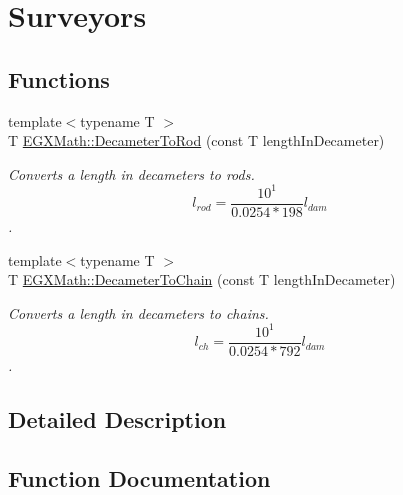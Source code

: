 \hypertarget{group___e_g_x_math-_conversions-_length_conversions-_s_i-_decameter-_surveyors}{}\section{Surveyors}
\label{group___e_g_x_math-_conversions-_length_conversions-_s_i-_decameter-_surveyors}
\subsection*{Functions}
\begin{DoxyCompactItemize}
\item 
{\footnotesize template$<$typename T $>$ }\\T \mbox{\hyperlink{group___e_g_x_math-_conversions-_length_conversions-_s_i-_decameter-_surveyors_ga0a6de708486617662fba474b67c8faa5}{E\+G\+X\+Math\+::\+Decameter\+To\+Rod}} (const T length\+In\+Decameter)
\begin{DoxyCompactList}\small\item\em Converts a length in decameters to rods. \[ l_{rod}= \frac{10^{1}}{0.0254 * 198} l_{dam} \]. \end{DoxyCompactList}\item 
{\footnotesize template$<$typename T $>$ }\\T \mbox{\hyperlink{group___e_g_x_math-_conversions-_length_conversions-_s_i-_decameter-_surveyors_ga7ede3a9605004deb5638075581637354}{E\+G\+X\+Math\+::\+Decameter\+To\+Chain}} (const T length\+In\+Decameter)
\begin{DoxyCompactList}\small\item\em Converts a length in decameters to chains. \[ l_{ch}= \frac{10^{1}}{0.0254 * 792} l_{dam} \]. \end{DoxyCompactList}\end{DoxyCompactItemize}


\subsection{Detailed Description}


\subsection{Function Documentation}
\mbox{\label{group___e_g_x_math-_conversions-_length_conversions-_s_i-_decameter-_surveyors_ga7ede3a9605004deb5638075581637354}} 
